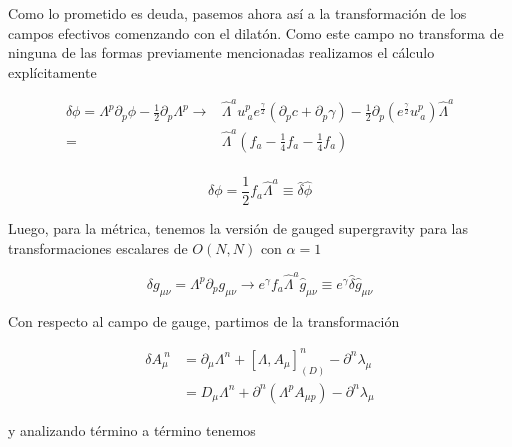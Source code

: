 \documentclass{article}
\numberwithin{equation}{section}
\begin{document}
Como lo prometido es deuda, pasemos ahora así a la transformación de los campos efectivos comenzando con el dilatón. Como este campo no transforma de ninguna de las formas previamente mencionadas realizamos el cálculo explícitamente  

\begin{equation}
\begin{aligned}
\delta \phi = \Lambda^p \partial_p \phi - \frac{1}{2} \partial_p \Lambda^p \longrightarrow& \hat{\Lambda}^a u^p_{\ a} e^{\frac{\gamma}{2}} \left( \partial_p c + \partial_p \gamma\right) -  \frac{1}{2} \partial_p \left(e^{\frac{\gamma}{2}} u^p_{\ a}\right) \hat{\Lambda}^a\\
=& \hat{\Lambda}^a \left( f_a - \frac{1}{4} f_a - \frac{1}{4} f_a \right)\\
\end{aligned}
\end{equation}

\begin{boxeq}
	\begin{equation}\label{hatdeltaphi}
	\delta \phi = \frac{1}{2} f_a \hat{\Lambda}^a \equiv \hat{\delta} \hat{\phi}
	\end{equation}
\end{boxeq}

Luego, para la métrica, tenemos la versión de gauged supergravity para las transformaciones escalares de $ O(N,N) $ con $ \alpha=1 $\\


\begin{boxeq}
	\begin{equation}
	\delta g_{\mu \nu} = \Lambda^p \partial_p g_{\mu \nu} \longrightarrow e^{\gamma} f_a \hat{\Lambda}^a \hat{g}_{\mu \nu} \equiv e^{\gamma} \hat{\delta} \hat{g}_{\mu \nu}
	\end{equation}
\end{boxeq}

Con respecto al campo de gauge, partimos de la transformación 

\begin{equation}
\begin{aligned}
\delta A_{\mu}^{\ n} &=\partial_{\mu} \Lambda^n + \left[ \Lambda, A_{\mu}\right]_{(D)}^n - \partial^n \lambda_{\mu}\\
&=D_{\mu}\Lambda^n + \partial^n \left( \Lambda^p A_{\mu p} \right) - \partial^n \lambda_{\mu}
\end{aligned}
\end{equation}

y analizando término a término tenemos 
\end{document}
